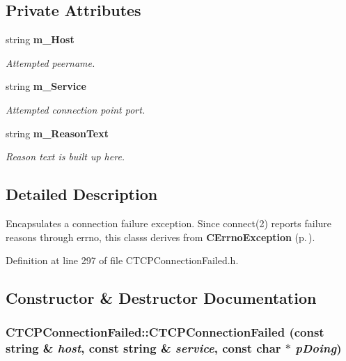 \subsection*{Private Attributes}
\begin{CompactItemize}
\item 
string {\bf m\_\-Host}
\begin{CompactList}\small\item\em Attempted peername.\item\end{CompactList}\item 
string {\bf m\_\-Service}
\begin{CompactList}\small\item\em Attempted connection point port.\item\end{CompactList}\item 
string {\bf m\_\-Reason\-Text}
\begin{CompactList}\small\item\em Reason text is built up here.\item\end{CompactList}\end{CompactItemize}


\subsection{Detailed Description}
Encapsulates a connection failure exception. Since connect(2) reports failure reasons through errno, this classs derives from {\bf CErrno\-Exception} {\rm (p.\,\pageref{classCErrnoException})}. 



Definition at line 297 of file CTCPConnection\-Failed.h.

\subsection{Constructor \& Destructor Documentation}
\subsubsection{\setlength{\rightskip}{0pt plus 5cm}CTCPConnection\-Failed::CTCPConnection\-Failed (const string \& {\em host}, const string \& {\em service}, const char $\ast$ {\em p\-Doing})}\label{classCTCPConnectionFailed_a0}


